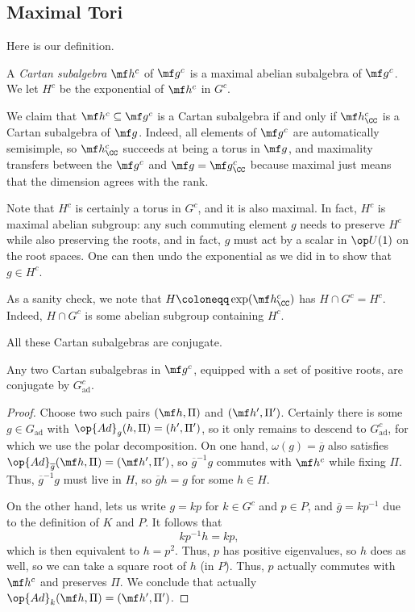 \documentclass[../notes.tex]{subfiles}
\begin{document}
\subsection{Maximal Tori}
Here is our definition.
\begin{definition}[Cartan]
	A \textit{Cartan subalgebra} $\mf h^c$ of $\mf g^c$ is a maximal abelian subalgebra of $\mf g^c$. We let $H^c$ be the exponential of $\mf h^c$ in $G^c$.
\end{definition}
\begin{remark}
	We claim that $\mf h^c\subseteq\mf g^c$ is a Cartan subalgebra if and only if $\mf h^c_\CC$ is a Cartan subalgebra of $\mf g$. Indeed, all elements of $\mf g^c$ are automatically semisimple, so $\mf h^c_\CC$ succeeds at being a torus in $\mf g$, and maximality transfers between the $\mf g^c$ and $\mf g=\mf g^c_\CC$ because maximal just means that the dimension agrees with the rank.
\end{remark}
\begin{remark} \label{rem:exp-to-torus}
	Note that $H^c$ is certainly a torus in $G^c$, and it is also maximal. In fact, $H^c$ is maximal abelian subgroup: any such commuting element $g$ needs to preserve $H^c$ while also preserving the roots, and in fact, $g$ must act by a scalar in $\op U(1)$ on the root spaces. One can then undo the exponential as we did in  to show that $g\in H^c$.
\end{remark}
\begin{remark}
	As a sanity check, we note that $H\coloneqq\exp(\mf h^c_\CC)$ has $H\cap G^c=H^c$. Indeed, $H\cap G^c$ is some abelian subgroup containing $H^c$.
\end{remark}
All these Cartan subalgebras are conjugate.
\begin{lemma} \label{lem:compact-cartan-conj}
	Any two Cartan subalgebras in $\mf g^c$, equipped with a set of positive roots, are conjugate by $G_{\mathrm{ad}}^c$.
\end{lemma}
\begin{proof}
	Choose two such pairs $(\mf h,\Pi)$ and $(\mf h',\Pi')$. Certainly there is some $g\in G_{\mathrm{ad}}$ with $\op{Ad}_g(h,\Pi)=(h',\Pi')$, so it only remains to descend to $G_{\mathrm{ad}}^c$, for which we use the polar decomposition. On one hand, $\omega(g)=\overline g$ also satisfies $\op{Ad}_{\overline g}(\mf h,\Pi)=(\mf h',\Pi')$, so $\overline g^{-1}g$ commutes with $\mf h^c$ while fixing $\Pi$. Thus, $\overline g^{-1}g$ must live in $H$, so $\overline gh=g$ for some $h\in H$.

	On the other hand,  lets us write $g=kp$ for $k\in G^c$ and $p\in P$, and $\overline g=kp^{-1}$ due to the definition of $K$ and $P$. It follows that
	\[kp^{-1}h=kp,\]
	which is then equivalent to $h=p^2$. Thus, $p$ has positive eigenvalues, so $h$ does as well, so we can take a square root of $h$ (in $P$). Thus, $p$ actually commutes with $\mf h^c$ and preserves $\Pi$. We conclude that actually $\op{Ad}_k(\mf h,\Pi)=(\mf h',\Pi')$.
\end{proof}
\end{document}
